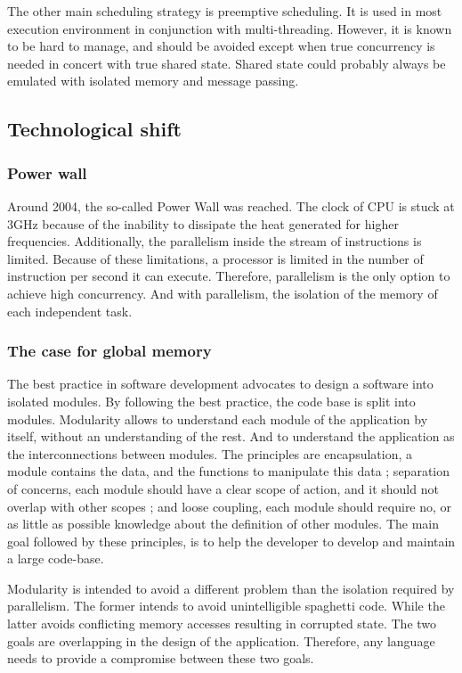 The other main scheduling strategy is preemptive scheduling.
It is used in most execution environment in conjunction with multi-threading.
However, it is known to be hard to manage, and should be avoided except when true concurrency is needed in concert with true shared state.
Shared state could probably always be emulated with isolated memory and message passing.

\subsection{Technological shift}

\subsubsection{Power wall}

Around 2004, the so-called Power Wall was reached.
The clock of CPU is stuck at 3GHz because of the inability to dissipate the heat generated for higher frequencies.
Additionally, the parallelism inside the stream of instructions is limited.
Because of these limitations, a processor is limited in the number of instruction per second it can execute.
Therefore, parallelism is the only option to achieve high concurrency.
And with parallelism, the isolation of the memory of each independent task.

\subsubsection{The case for global memory}

The best practice in software development advocates to design a software into isolated modules.
By following the best practice, the code base is split into modules.
Modularity allows to understand each module of the application by itself, without an understanding of the rest.
And to understand the application as the interconnections between modules.
The principles are encapsulation, a module contains the data, and the functions to manipulate this data ; separation of concerns, each module should have a clear scope of action, and it should not overlap with other scopes ; and loose coupling, each module should require no, or as little as possible knowledge about the definition of other modules.
The main goal followed by these principles, is to help the developer to develop and maintain a large code-base.

Modularity is intended to avoid a different problem than the isolation required by parallelism.
The former intends to avoid unintelligible spaghetti code.
While the latter avoids conflicting memory accesses resulting in corrupted state.
The two goals are overlapping in the design of the application.
Therefore, any language needs to provide a compromise between these two goals.

